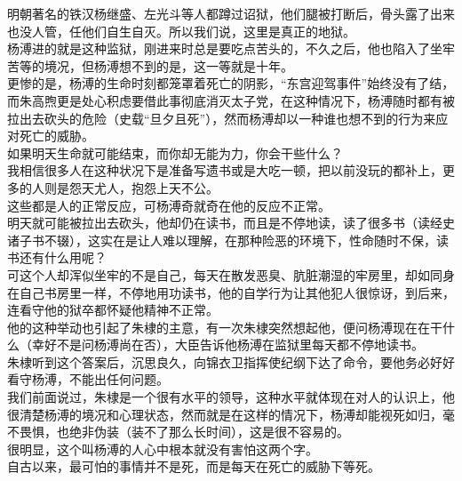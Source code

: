 \begin{multicols}{\theparacolNo}
明朝著名的铁汉杨继盛、左光斗等人都蹲过诏狱，他们腿被打断后，骨头露了出来也没人管，任他们自生自灭。所以我们说，这里是真正的地狱。\\

杨溥进的就是这种监狱，刚进来时总是要吃点苦头的，不久之后，他也陷入了坐牢苦等的境况，但杨溥想不到的是，这一等就是十年。\\

更惨的是，杨溥的生命时刻都笼罩着死亡的阴影，“东宫迎驾事件”始终没有了结，而朱高煦更是处心积虑要借此事彻底消灭太子党，在这种情况下，杨溥随时都有被拉出去砍头的危险（史载“旦夕且死”），然而杨溥却以一种谁也想不到的行为来应对死亡的威胁。\\

如果明天生命就可能结束，而你却无能为力，你会干些什么？\\

我相信很多人在这种状况下是准备写遗书或是大吃一顿，把以前没玩的都补上，更多的人则是怨天尤人，抱怨上天不公。\\

这些都是人的正常反应，可杨溥奇就奇在他的反应不正常。\\

明天就可能被拉出去砍头，他却仍在读书，而且是不停地读，读了很多书（读经史诸子书不辍），这实在是让人难以理解，在那种险恶的环境下，性命随时不保，读书还有什么用呢？\\

可这个人却浑似坐牢的不是自己，每天在散发恶臭、肮脏潮湿的牢房里，却如同身在自己书房里一样，不停地用功读书，他的自学行为让其他犯人很惊讶，到后来，连看守他的狱卒都怀疑他精神不正常。\\

他的这种举动也引起了朱棣的主意，有一次朱棣突然想起他，便问杨溥现在在干什么（幸好不是问杨溥尚在否），大臣告诉他杨溥在监狱里每天都不停地读书。\\

朱棣听到这个答案后，沉思良久，向锦衣卫指挥使纪纲下达了命令，要他务必好好看守杨溥，不能出任何问题。\\

我们前面说过，朱棣是一个很有水平的领导，这种水平就体现在对人的认识上，他很清楚杨溥的境况和心理状态，然而就是在这样的情况下，杨溥却能视死如归，毫不畏惧，也绝非伪装（装不了那么长时间），这是很不容易的。\\

很明显，这个叫杨溥的人心中根本就没有害怕这两个字。\\

自古以来，最可怕的事情并不是死，而是每天在死亡的威胁下等死。\\


\end{multicols}
